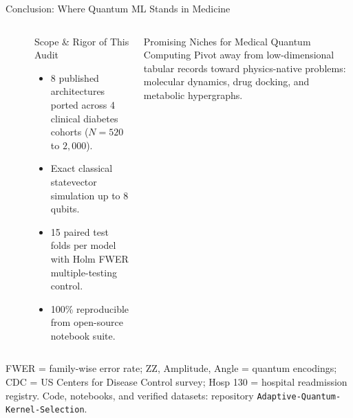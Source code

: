 \documentclass[aspectratio=169,10pt,t,xcolor={table,dvipsnames}]{beamer}
\newcommand{\pfoot}[1]{\vfill{\raggedright\tiny\color{qslate}#1\par}}
\providecommand{\tlC}[1]{\tikz[baseline=-0.6ex]\fill[#1] (0,0) circle (0.11);}
\begin{document}
\begin{frame}{Conclusion: Where Quantum ML Stands in Medicine}
  \begin{columns}[T]
      \\[3pt]
      \\[3pt]

      \begin{block}{Scope \& Rigor of This Audit}
        \scriptsize
        \begin{itemize}
          \item 8 published architectures ported across 4 clinical diabetes cohorts ($N=520$ to $2{,}000$).
          \item Exact classical statevector simulation up to 8 qubits.
          \item 15 paired test folds per model with Holm FWER multiple-testing control.
          \item 100\% reproducible from open-source notebook suite.
        \end{itemize}
      \end{block}
      \begin{exampleblock}{Promising Niches for Medical Quantum Computing}
        \scriptsize Pivot away from low-dimensional tabular records toward physics-native problems: molecular dynamics, drug docking, and metabolic hypergraphs.
      \end{exampleblock}
  \end{columns}
  \pfoot{FWER = family-wise error rate; ZZ, Amplitude, Angle = quantum encodings; CDC = US Centers for Disease Control survey; Hosp 130 = hospital readmission registry. Code, notebooks, and verified datasets: repository \texttt{Adaptive-Quantum-Kernel-Selection}.}
\end{frame}
\end{document}
